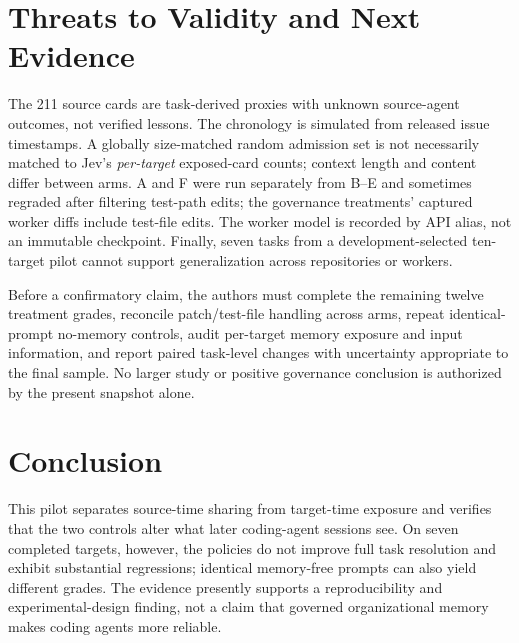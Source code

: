 \documentclass[sigconf,anonymous]{aamas}
\begin{document}
\section{Threats to Validity and Next Evidence}
The 211 source cards are task-derived proxies with unknown source-agent outcomes, not verified lessons. The chronology is simulated from released issue timestamps. A globally size-matched random admission set is not necessarily matched to Jev's \emph{per-target} exposed-card counts; context length and content differ between arms. A and F were run separately from B--E and sometimes regraded after filtering test-path edits; the governance treatments' captured worker diffs include test-file edits. The worker model is recorded by API alias, not an immutable checkpoint. Finally, seven tasks from a development-selected ten-target pilot cannot support generalization across repositories or workers.

Before a confirmatory claim, the authors must complete the remaining twelve treatment grades, reconcile patch/test-file handling across arms, repeat identical-prompt no-memory controls, audit per-target memory exposure and input information, and report paired task-level changes with uncertainty appropriate to the final sample. No larger study or positive governance conclusion is authorized by the present snapshot alone.

\section{Conclusion}
This pilot separates source-time sharing from target-time exposure and verifies that the two controls alter what later coding-agent sessions see. On seven completed targets, however, the policies do not improve full task resolution and exhibit substantial regressions; identical memory-free prompts can also yield different grades. The evidence presently supports a reproducibility and experimental-design finding, not a claim that governed organizational memory makes coding agents more reliable.



\end{document}
